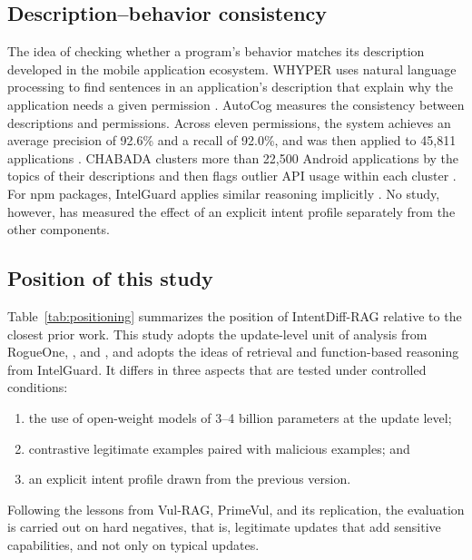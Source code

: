 \documentclass[a4paper,fleqn]{cas-dc}
\begin{document}
\subsection{Description--behavior consistency}

The idea of checking whether a program's behavior matches its description
developed in the mobile application ecosystem. WHYPER uses natural language
processing to find sentences in an application's description that explain why the
application needs a given permission \citep{pandita2013whyper}. AutoCog measures
the consistency between descriptions and permissions. Across eleven permissions,
the system achieves an average precision of 92.6\% and a recall of 92.0\%, and
was then applied to 45,811 applications \citep{qu2014autocog}. CHABADA clusters
more than 22,500 Android applications by the topics of their descriptions and
then flags outlier API usage within each cluster \citep{gorla2014checking}. For
npm packages, IntelGuard applies similar reasoning implicitly
\citep{guo2026bridging}. No study, however, has measured the effect of an
explicit intent profile separately from the other components.

\subsection{Position of this study}

Table~\ref{tab:positioning} summarizes the position of IntentDiff-RAG relative to
the closest prior work. This study adopts the update-level unit of analysis from
RogueOne, \citet{froh2023differential}, and \citet{wyss2025evaluating}, and adopts
the ideas of retrieval and function-based reasoning from IntelGuard. It differs
in three aspects that are tested under controlled conditions:
\begin{enumerate}
  \item the use of open-weight models of 3--4 billion parameters at the update
  level;
  \item contrastive legitimate examples paired with malicious examples; and
  \item an explicit intent profile drawn from the previous version.
\end{enumerate}
Following the lessons from Vul-RAG, PrimeVul, and its replication, the evaluation
is carried out on hard negatives, that is, legitimate updates that add sensitive
capabilities, and not only on typical updates.
\end{document}
